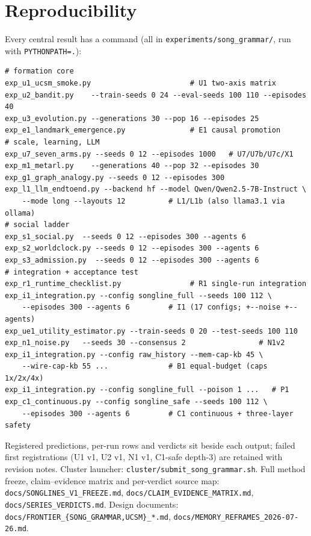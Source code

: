 \documentclass{article}
\begin{document}
\section{Reproducibility}
\label{app:repro}
Every central result has a command (all in
\texttt{experiments/song\_grammar/}, run with \texttt{PYTHONPATH=.}):
\begin{verbatim}
# formation core
exp_u1_ucsm_smoke.py                       # U1 two-axis matrix
exp_u2_bandit.py    --train-seeds 0 24 --eval-seeds 100 110 --episodes 40
exp_u3_evolution.py --generations 30 --pop 16 --episodes 25
exp_e1_landmark_emergence.py               # E1 causal promotion
# scale, learning, LLM
exp_u7_seven_arms.py --seeds 0 12 --episodes 1000   # U7/U7b/U7c/X1
exp_m1_metarl.py    --generations 40 --pop 32 --episodes 30
exp_g1_graph_analogy.py --seeds 0 12 --episodes 300
exp_l1_llm_endtoend.py --backend hf --model Qwen/Qwen2.5-7B-Instruct \
    --mode long --layouts 12          # L1/L1b (also llama3.1 via ollama)
# social ladder
exp_s1_social.py  --seeds 0 12 --episodes 300 --agents 6
exp_s2_worldclock.py --seeds 0 12 --episodes 300 --agents 6
exp_s3_admission.py  --seeds 0 12 --episodes 300 --agents 6
# integration + acceptance test
exp_r1_runtime_checklist.py                # R1 single-run integration
exp_i1_integration.py --config songline_full --seeds 100 112 \
    --episodes 300 --agents 6         # I1 (17 configs; +--noise +--agents)
exp_ue1_utility_estimator.py --train-seeds 0 20 --test-seeds 100 110
exp_n1_noise.py   --seeds 30 --consensus 2                 # N1v2
exp_i1_integration.py --config raw_history --mem-cap-kb 45 \
    --wire-cap-kb 55 ...              # B1 equal-budget (caps 1x/2x/4x)
exp_i1_integration.py --config songline_full --poison 1 ...   # P1
exp_c1_continuous.py --config songline_safe --seeds 100 112 \
    --episodes 300 --agents 6         # C1 continuous + three-layer safety
\end{verbatim}
Registered predictions, per-run rows and verdicts sit beside each
output; failed first registrations (U1 v1, U2 v1, N1 v1, C1-safe
depth-3) are retained with revision notes. Cluster launcher:
\texttt{cluster/submit\_song\_grammar.sh}. Full method freeze,
claim--evidence matrix and per-verdict source map:
\texttt{docs/SONGLINES\_V1\_FREEZE.md},
\texttt{docs/CLAIM\_EVIDENCE\_MATRIX.md},
\texttt{docs/SERIES\_VERDICTS.md}. Design documents:
\texttt{docs/FRONTIER\_\{SONG\_GRAMMAR,UCSM\}\_*.md},
\texttt{docs/MEMORY\_REFRAMES\_2026-07-26.md}.
\end{document}
